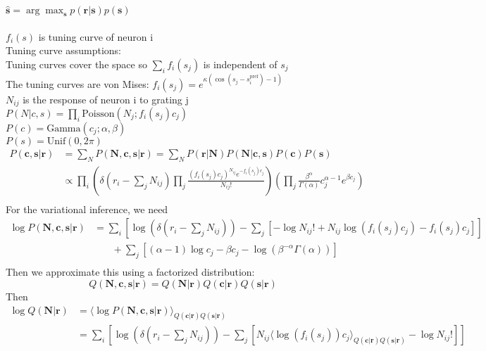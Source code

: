 \documentclass[12pt]{article}
\begin{document}
$\hat{\mathbf{s}} = \arg\max_\mathbf{s} p(\mathbf{r|s}) p(\mathbf{s})$
\\
\\
$f_i(s)$ is tuning curve of neuron i\\
Tuning curve assumptions:\\
Tuning curves cover the space so $\sum_i f_i(s_j)$ is independent of $s_j$\\
The tuning curves are von Mises: $f_i(s_j) = e^{\kappa(\cos(s_j - s_i^{\text{pref}}) - 1)}$\\
$N_{ij}$ is the response of neuron i to grating j\\
$P(N|c, s) = \prod_i \text{Poisson}(N_{j}; f_i(s_j)c_j)$\\
$P(c) = \text{Gamma}(c_j; \alpha, \beta)$\\
$P(s) = \text{Unif}(0, 2\pi)$\\
\begin{equation}
\begin{aligned}
P(\mathbf{c, s|r}) & = \sum_N P(\mathbf{N, c, s|r}) = \sum_N P(\mathbf{r|N}) P(\mathbf{N|c, s}) P(\mathbf{c}) P(\mathbf{s})\\
&\propto \prod_i (\delta(r_i - \sum_j N_{ij}) \prod_j\frac{(f_i(s_j)c_j)^{N_{ij}} e^{-f_i(s_j) c_j}}{N_{ij}!}) (\prod_j \frac{\beta^{\alpha}}{\Gamma(\alpha)} c_j^{\alpha - 1}e^{\beta c_j})\\
\end{aligned}
\end{equation}
For the variational inference, we need\\
\begin{equation}
\begin{aligned}
\log P(\mathbf{N, c, s| r}) &= \sum_i [\log(\delta(r_i - \sum_j N_{ij})) - \sum_j [- \log N_{ij}! + N_{ij} \log(f_i(s_j)c_j) - f_i(s_j) c_j]]\\
& \phantom{{}=1} + \sum_j[(\alpha - 1) \log c_j - \beta c_j - \log (\beta^{- \alpha} \Gamma (\alpha))]\\
\end{aligned}
\end{equation}
Then we approximate this using a factorized distribution:\\
\begin{equation}
Q(\mathbf{N, c, s|r}) = Q(\mathbf{N|r}) Q(\mathbf{c|r}) Q(\mathbf{s|r})
\end{equation}
Then
\begin{equation}
\begin{aligned}
\log Q(\mathbf{N|r}) &= \langle \log P(\mathbf{N, c, s|r}) \rangle_{Q(\mathbf{c|r})Q(\mathbf{s|r})}\\
&= \sum_i [\log(\delta(r_i - \sum_j N_{ij})) - \sum_j [N_{ij} \langle \log(f_i (s_j)) c_j \rangle_{Q(\mathbf{c|r})Q(\mathbf{s|r})} - \log N_{ij}!]]\\
\end{aligned}
\end{equation}
\end{document}
